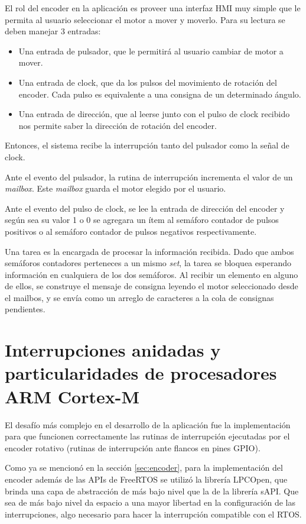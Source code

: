 \documentclass{IEEEtran}
\begin{document}
El rol del encoder en la aplicación es proveer una interfaz HMI muy simple que le permita al usuario seleccionar el motor a mover y moverlo. Para su lectura se deben manejar 3 entradas:

\begin{itemize}
    \item Una entrada de pulsador, que le permitirá al usuario cambiar de motor a mover.
    \item Una entrada de clock, que da los pulsos del movimiento de rotación del encoder. Cada pulso es equivalente a una consigna de un determinado ángulo.
    \item Una entrada de dirección, que al leerse junto con el pulso de clock recibido nos permite saber la dirección de rotación del encoder.
\end{itemize}

Entonces, el sistema recibe la interrupción tanto del pulsador como la señal de clock.

Ante el evento del pulsador, la rutina de interrupción incrementa el valor de un \textit{mailbox}. Este \textit{mailbox} guarda el motor elegido por el usuario.

Ante el evento del pulso de clock, se lee la entrada de dirección del encoder y según sea su valor 1 o 0 se agregara un ítem al semáforo contador de pulsos positivos o al semáforo contador de pulsos negativos respectivamente.

Una tarea es la encargada de procesar la información recibida. Dado que ambos semáforos contadores perteneces a un mismo \textit{set}, la tarea se bloquea esperando información en cualquiera de los dos semáforos. Al recibir un elemento en alguno de ellos, se construye el mensaje de consigna leyendo el motor seleccionado desde el mailbos, y se envía como un arreglo de caracteres a la cola de consignas pendientes.

\section{Interrupciones anidadas y particularidades de procesadores ARM Cortex-M}
El desafío más complejo en el desarrollo de la aplicación fue la implementación para que funcionen correctamente las rutinas de interrupción ejecutadas por el encoder rotativo (rutinas de interrupción ante flancos en pines GPIO).

Como ya se mencionó en la sección \ref{sec:encoder}, para la implementación del encoder además de las APIs de FreeRTOS se utilizó la librería LPCOpen, que brinda una capa de abstracción de más bajo nivel que la de la librería sAPI. Que sea de más bajo nivel da espacio a una mayor libertad en la configuración de las interrupciones, algo necesario para hacer la interrupción compatible con el RTOS.
\end{document}
